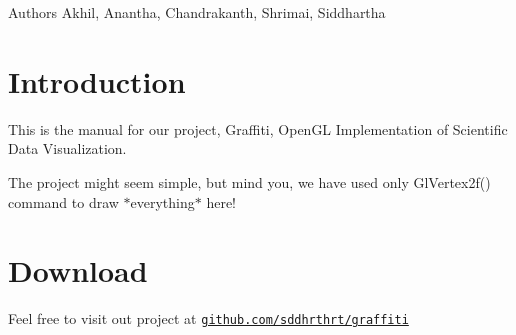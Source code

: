 \begin{DoxyAuthor}{Authors}
Akhil, Anantha, Chandrakanth, Shrimai, Siddhartha 
\end{DoxyAuthor}
\hypertarget{index_Introduction}{}\section{Introduction}\label{index_Introduction}
This is the manual for our project, Graffiti, OpenGL Implementation of Scientific Data Visualization. \par
 The project might seem simple, but mind you, we have used only GlVertex2f() command to draw $\ast$everything$\ast$ here! \hypertarget{index_Download}{}\section{Download}\label{index_Download}
Feel free to visit out project at \href{http://github.com/sddhrthrt/graffiti}{\tt github.com/sddhrthrt/graffiti} 